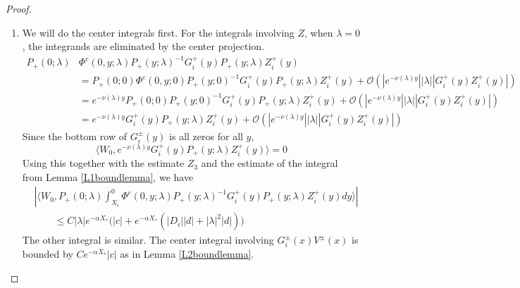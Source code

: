 \documentclass[thesis.tex]{subfiles}
\begin{document}
\begin{lemma}
\begin{proof}
\begin{enumerate}
\item We will do the center integrals first. For the integrals involving $Z$, when $\lambda = 0$, the integrands are eliminated by the center projection. 
\begin{align*}
P_+(0; \lambda) &\Phi^c(0, y; \lambda) P_+(y; \lambda)^{-1} G_i^+(y) P_+(y; \lambda) Z_i^+(y) \\
&= P_+(0; 0) \Phi^c(0, y; 0) P_+(y; 0)^{-1} G_i^+(y) P_+(y; \lambda) Z_i^+(y) + \mathcal{O}(|e^{-\nu(\lambda) y}||\lambda||G_i^+(y) Z_i^+(y)|) \\
&= e^{-\nu(\lambda) y} P_+(0; 0) P_+(y; 0)^{-1} G_i^+(y) P_+(y; \lambda) Z_i^+(y) + \mathcal{O}(|e^{-\nu(\lambda) y}||\lambda||G_i^+(y) Z_i^+(y)|) \\
&= e^{-\nu(\lambda) y} G_i^+(y) P_+(y; \lambda) Z_i^+(y) + \mathcal{O}(|e^{-\nu(\lambda) y}||\lambda||G_i^+(y) Z_i^+(y)|)
\end{align*}
Since the bottom row of $G_i^\pm(y)$ is all zeros for all $y$, 
\[
\langle W_0, e^{-\nu(\lambda) y} G_i^+(y) P_+(y; \lambda) Z_i^+(y) \rangle = 0
\]
Using this together with the estimate $Z_3$ and the estimate of the integral from Lemma \ref{L1boundlemma}, we have
\begin{align*}
&\left| \langle W_0, P_+(0; \lambda) \int_{X_i}^0 \Phi^c(0, y; \lambda) P_+(y; \lambda)^{-1} G_i^+(y) P_+(y; \lambda) Z_i^+(y) dy \rangle \right| \\
&\qquad \leq C |\lambda| e^{-\alpha X_*}\Big(|c| + e^{-\alpha X_*}\left(|D_i||d| + |\lambda|^2|d|\right) \Big)
\end{align*}
The other integral is similar. The center integral involving $G_i^\pm(x) V^\pm(x)$ is bounded by $C e^{-\alpha X_*}|c|$ as in Lemma \ref{L2boundlemma}.


\end{enumerate}
\end{proof}
\end{lemma}
\end{document}
